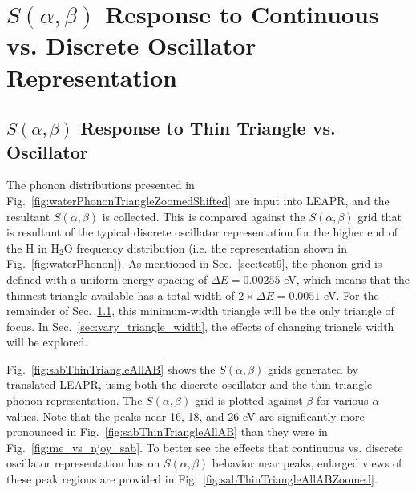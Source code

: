 \documentclass[Master.tex]{subfiles}
\begin{document}
\section{$S(\alpha,\beta)$ Response to Continuous vs. Discrete Oscillator Representation} 

  \subsection{$S(\alpha,\beta)$ Response to Thin Triangle vs. Oscillator}\label{sec:thin_triangle_vs_delta}
    The phonon distributions presented in Fig.~\ref{fig:waterPhononTriangleZoomedShifted} are input into LEAPR, and the resultant $S(\alpha,\beta)$ is collected. This is compared against the $S(\alpha,\beta)$ grid that is resultant of the typical discrete oscillator representation for the higher end of the H in H$_2$O frequency distribution (i.e. the representation shown in Fig.~\ref{fig:waterPhonon}). As mentioned in Sec.~\ref{sec:test9}, the phonon grid is defined with a uniform energy spacing of $\Delta E=0.00255$  eV, which means that the thinnest triangle available has a total width of $2\times\Delta E=0.0051$ eV. For the remainder of Sec.~\ref{sec:thin_triangle_vs_delta}, this minimum-width triangle will be the only triangle of focus. In Sec.~\ref{sec:vary_triangle_width}, the effects of changing triangle width will be explored.

    Fig.~\ref{fig:sabThinTriangleAllAB} shows the $S(\alpha,\beta)$ grids generated by translated LEAPR, using both the discrete oscillator and the thin triangle phonon representation. The $S(\alpha,\beta)$ grid is plotted against $\beta$ for various $\alpha$ values. Note that the peaks near 16, 18, and 26 eV are significantly more pronounced in Fig.~\ref{fig:sabThinTriangleAllAB} than they were in Fig.~\ref{fig:me_vs_njoy_sab}. To better see the effects that continuous vs. discrete oscillator representation has on $S(\alpha,\beta)$ behavior near peaks, enlarged views of these peak regions are provided in Fig.~\ref{fig:sabThinTriangleAllABZoomed}.
\end{document}
